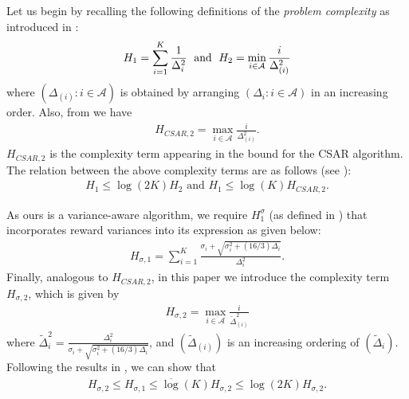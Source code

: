 
Let us begin by recalling the following definitions of the  \emph{problem complexity} as introduced in \cite{locatelli2016optimal}:
\begin{align*}
H_{1} = \sum_{i=1}^{K}\dfrac{1}{\Delta_{i}^{2}} \hspace{1mm}\text{     and }  \hspace{1mm}
H_{2} =\min_{i\in \mathcal{A}}\dfrac{i}{{\Delta_{(i)}^{2}}} 
\end{align*}
where $(\Delta_{(i)}: i\in\mathcal{A})$ is obtained by arranging $(\Delta_i:i\in\mathcal{A})$ in an increasing order. Also, from \cite{chen2014combinatorial} we have
\begin{align*}
H_{CSAR,2}=\max_{i\in\mathcal{A}}\frac{i}{\Delta_{(i)}^2}.
\end{align*}
$H_{CSAR,2}$ is the complexity term appearing in the bound for the CSAR algorithm. The relation between the above complexity terms are as follows (see \cite{locatelli2016optimal}):
%
\begin{align*}
H_{1}\leq \log(2K)H_{2} \mbox{ and }
 H_1 \leq \log(K)H_{CSAR,2}.
\end{align*}

As ours is a variance-aware algorithm, we require $H_{1}^{\sigma}$ (as defined in \cite{gabillon2011multi}) that incorporates reward variances into its expression as given below:
\begin{align*}
 H_{\sigma,1}=\sum_{i=1}^{K}\frac{\sigma_{i}+\sqrt{\sigma_{i}^{2}+(16/3)\Delta_{i}}}{\Delta_{i}^{2}}.
\end{align*}
Finally, analogous to $H_{CSAR,2}$, in this paper we introduce the complexity term $H_{\sigma,2}$, which is given by
\begin{align*}
H_{\sigma,2}=\max_{i\in \mathcal{A}} \frac{i}{\tilde{\Delta}_{(i)}^{2}}%
\end{align*}
where $\tilde{\Delta}_{i}^{2}=\frac{\Delta_{i}^{2}}{\sigma_{i}+\sqrt{\sigma_{i}^{2}+(16/3)\Delta_{i}}}$, and $(\tilde{\Delta}_{(i)})$ is an increasing ordering of $(\tilde{\Delta}_{i})$. Following the results in \cite{audibert2010best}, we can show that
\begin{align*}
H_{\sigma,2}\le H_{\sigma,1}\le\overline{\log}(K) H_{\sigma,2} \le \log(2K) H_{\sigma,2}.
\end{align*}


